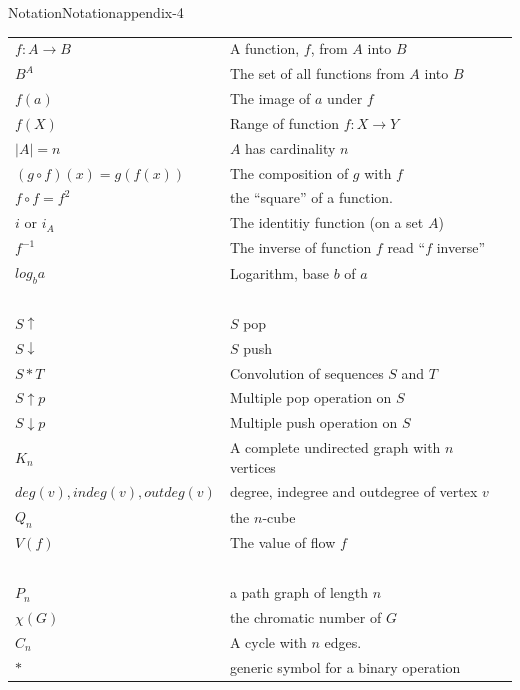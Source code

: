 \documentclass[twoside,10pt,]{book}
\numberwithin{equation}{section}
\begin{document}
\begin{appendixptx}{Notation}{}{Notation}{}{}{appendix-4}
\begin{longtable}[l]{lp{}r}
\(f:A \rightarrow B\)&A function, \(f\), from \(A\) into \(B\)&\pageref{notation-39}\\
\(B^A\)&The set of all functions from \(A\) into \(B\)&\pageref{notation-40}\\
\(f(a)\)&The image of \(a\) under \(f\)&\pageref{notation-41}\\
\(f(X)\)&Range of function \(f:X \rightarrow Y\)&\pageref{notation-42}\\
\(\lvert A \rvert = n\)&\(A\) has cardinality \(n\)&\pageref{notation-43}\\
\((g \circ f)(x) = g(f(x))\)&The composition of \(g\) with \(f\)&\pageref{notation-44}\\
\(f \circ f = f^2\)&the ``square'' of a function.&\pageref{notation-45}\\
\(i \textrm{ or } i_A\)&The identitiy function (on a set \(A\))&\pageref{notation-46}\\
\(f^{-1}\)&The inverse of function \(f\) read ``\(f\) inverse''&\pageref{notation-47}\\
\(log_b a\)&Logarithm, base \(b\) of \(a\)&\pageref{notation-48}\\
\(\)&&\pageref{notation-49}\\
\(S\uparrow\)&\(S\) pop&\pageref{notation-50}\\
\(S\downarrow\)&\(S\) push&\pageref{notation-51}\\
\(S*T\)&Convolution of sequences \(S\) and \(T\)&\pageref{notation-52}\\
\(S\uparrow p\)&Multiple pop operation on \(S\)&\pageref{notation-53}\\
\(S\downarrow p\)&Multiple push operation on \(S\)&\pageref{notation-54}\\
\(K_n\)&A complete undirected graph with \(n\) vertices&\pageref{notation-55}\\
\(deg(v), indeg(v), outdeg(v)\)&degree, indegree and outdegree of vertex \(v\)&\pageref{notation-56}\\
\(Q_n\)&the \(n\)-cube&\pageref{notation-57}\\
\(V(f)\)&The value of flow \(f\)&\pageref{notation-58}\\
\(\)&&\pageref{notation-59}\\
\(P_n\)&a path graph of length \(n\)&\pageref{notation-60}\\
\(\chi(G)\)&the chromatic number of \(G\)&\pageref{notation-61}\\
\(C_n\)&A cycle with \(n\) edges.&\pageref{notation-62}\\
\(*\)&generic symbol for a binary operation&\pageref{notation-63}\\

\end{longtable}
\end{appendixptx}
\end{document}
